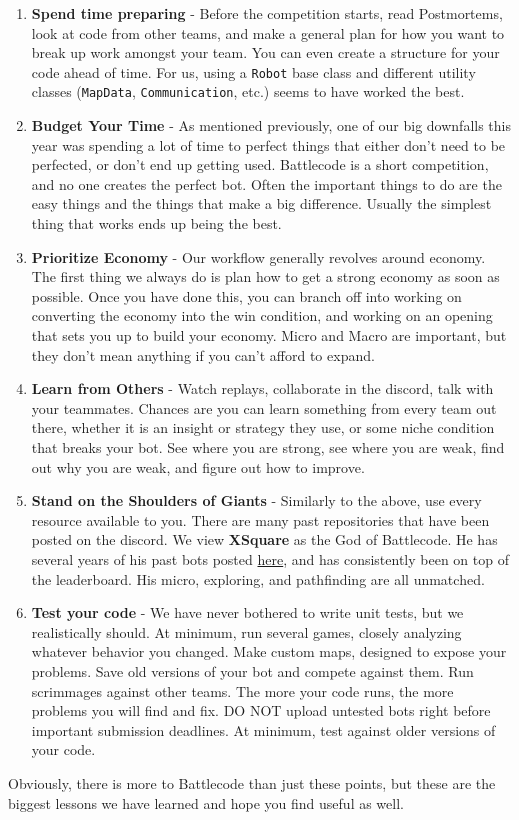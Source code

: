 \begin{enumerate}
  \item \textbf{Spend time preparing} - Before the competition starts, read Postmortems, look at code from other teams, and make a general plan for how you want to break up work amongst your team. You can even create a structure for your code ahead of time. For us, using a \verb|Robot| base class and different utility classes (\verb|MapData|, \verb|Communication|, etc.) seems to have worked the best.
  \item \textbf{Budget Your Time} - As mentioned previously, one of our big downfalls this year was spending a lot of time to perfect things that either don't need to be perfected, or don't end up getting used. Battlecode is a short competition, and no one creates the perfect bot. Often the important things to do are the easy things and the things that make a big difference. Usually the simplest thing that works ends up being the best.
  \item \textbf{Prioritize Economy} - Our workflow generally revolves around economy. The first thing we always do is plan how to get a strong economy as soon as possible. Once you have done this, you can branch off into working on converting the economy into the win condition, and working on an opening that sets you up to build your economy. Micro and Macro are important, but they don't mean anything if you can't afford to expand.
  \item \textbf{Learn from Others} - Watch replays, collaborate in the discord, talk with your teammates. Chances are you can learn something from every team out there, whether it is an insight or strategy they use, or some niche condition that breaks your bot. See where you are strong, see where you are weak, find out why you are weak, and figure out how to improve.
  \item \textbf{Stand on the Shoulders of Giants} - Similarly to the above, use every resource available to you. There are many past repositories that have been posted on the discord. We view \textbf{XSquare} as the God of Battlecode. He has several years of his past bots posted \href{https://github.com/IvanGeffner}{here}, and has consistently been on top of the leaderboard. His micro, exploring, and pathfinding are all unmatched.
  \item \textbf{Test your code} - We have never bothered to write unit tests, but we realistically should. At minimum, run several games, closely analyzing whatever behavior you changed. Make custom maps, designed to expose your problems. Save old versions of your bot and compete against them. Run scrimmages against other teams. The more your code runs, the more problems you will find and fix. DO NOT upload untested bots right before important submission deadlines. At minimum, test against older versions of your code.
\end{enumerate}

Obviously, there is more to Battlecode than just these points, but these are the biggest lessons we have learned and hope you find useful as well.